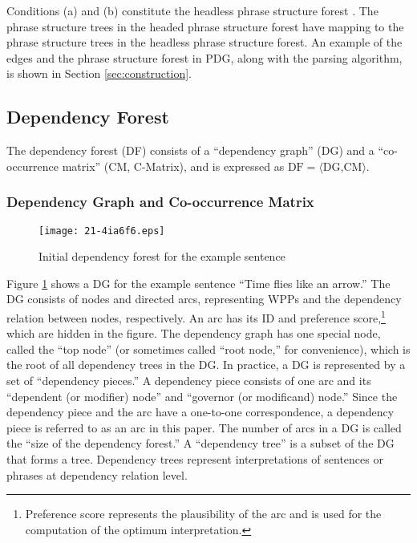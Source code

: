 \documentclass[english]{jnlp_1.4_rep}
\theoremstyle{break}
\theoremstyle{plain}
\theoremstyle{plain}
\begin{document}
\noindent
Conditions (a) and (b) constitute the headless phrase
structure forest \cite{Schiehlen96}. The phrase structure trees in the
headed phrase structure forest have mapping to the phrase structure
trees in the headless phrase structure forest. An example of the edges
and the phrase structure forest in PDG, along with the parsing
algorithm, is shown in Section \ref{sec:construction}.


\subsection{Dependency Forest}

The dependency forest (DF) consists of a ``dependency graph'' (DG) and
a ``co-occurrence matrix'' (CM, C-Matrix), and is expressed as $\mathrm{DF}=\langle\text{DG,CM}\rangle$.


\subsubsection{Dependency Graph and Co-occurrence Matrix}

\begin{figure}[b]
\begin{center}
\texttt{[image: 21-4ia6f6.eps]}
 \end{center}
\caption{Initial dependency forest for the example sentence}
\label{fig:IDF}
\end{figure}

Figure \ref{fig:IDF} shows a DG for the example sentence ``Time flies
like an arrow.'' The DG consists of nodes and directed arcs,
representing WPPs and the dependency relation between nodes,
respectively. An arc has its ID and preference score,\footnote{
  Preference score represents the plausibility of the arc and is used
  for the computation of the optimum interpretation.} which are hidden
in the figure. The dependency graph has one special node, called the
``top node'' (or sometimes called ``root node,'' for convenience),
which is the root of all dependency trees in the DG. In practice, a DG
is represented by a set of ``dependency pieces.'' A dependency piece
consists of one arc and its ``dependent (or modifier) node'' and
``governor (or modificand) node.'' Since the dependency piece and the
arc have a one-to-one correspondence, a dependency piece is referred
to as an arc in this paper. The number of arcs in a DG is called
the ``size of the dependency forest.'' A ``dependency tree'' is a subset
of the DG that forms a tree. Dependency trees represent
interpretations of sentences or phrases at dependency relation level.
\end{document}
